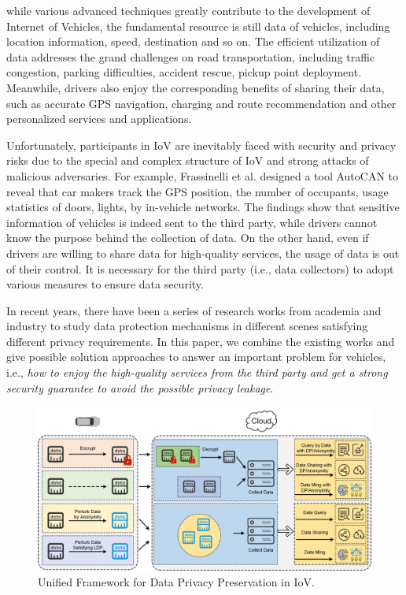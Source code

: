 \documentclass[journal,transmag,11pt]{IEEEtran}
\begin{document}
while various advanced techniques greatly contribute to the development of Internet of Vehicles, the fundamental resource is still data of vehicles, including location information, speed, destination and so on. The efficient utilization of data addresses the grand challenges on road transportation, including traffic congestion, parking difficulties, accident rescue, pickup point deployment. Meanwhile, drivers also enjoy the corresponding benefits of sharing their data, such as accurate GPS navigation, charging and route recommendation and other personalized services and applications. 

Unfortunately, participants in IoV are inevitably faced with security and privacy risks due to the special and complex structure of IoV and strong attacks of malicious adversaries. For example, Frassinelli et al. \cite{conf/sp/FrassinelliPN20} designed a tool \textsf{AutoCAN} to reveal that car makers track the GPS position, the number of occupants, usage statistics of doors, lights, by in-vehicle networks. The findings show that sensitive information of vehicles is indeed sent to the third party, while drivers cannot know the purpose behind the collection of data. On the other hand, even if drivers are willing to share data for high-quality services, the usage of data is out of their control. It is necessary for the third party (i.e., data collectors) to adopt various measures to ensure data security. 

In recent years, there have been a series of research works from academia and industry to study data protection mechanisms in different scenes satisfying different privacy requirements. In this paper, we combine the existing works and give possible solution approaches to answer an important problem for vehicles, i.e., \textit{how to enjoy the high-quality services from the third party and get a strong security guarantee to avoid the possible privacy leakage}. 

\begin{figure}[tbp]
	\centering
	\includegraphics[width=0.98\linewidth]{framework.jpg}
	\caption{Unified Framework for Data Privacy Preservation in IoV.}
	\label{fig_framework}
\end{figure}
\end{document}
